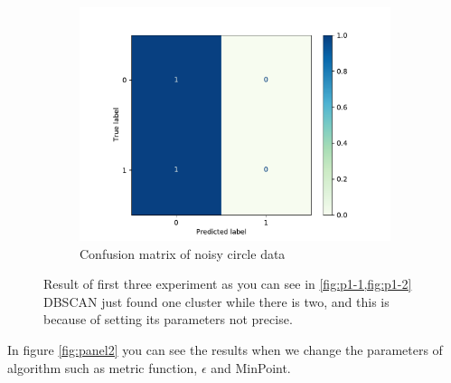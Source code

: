 \begin{figure}[h]
\begin{subfigure}{0.33\textwidth}
		\includegraphics[width=\linewidth]{figures/3-cm-NoisyCircle}  
		\caption{Confusion matrix of noisy circle data}
		\label{fig:p1-6}
	\end{subfigure}
	\caption{Result of first  three experiment as you can see in \cref{fig:p1-1,fig:p1-2} DBSCAN just found one cluster while there is two, and this is because of setting its parameters not precise.}
	\label{fig:panel1}
\end{figure}
In figure \ref{fig:panel2} you can see the results when we change the parameters of algorithm such as metric function, $\epsilon$ and MinPoint.

